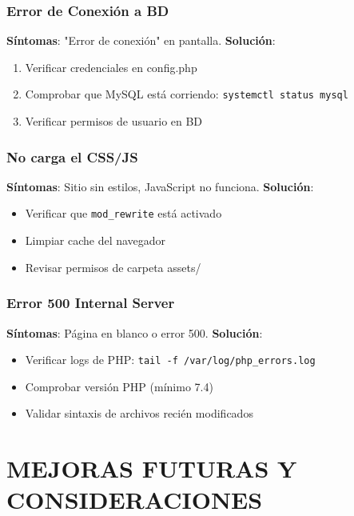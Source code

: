 \documentclass[12pt, a4paper]{report}
\begin{document}
\subsection{Error de Conexión a BD}
\textbf{Síntomas}: "Error de conexión" en pantalla.
\textbf{Solución}:
\begin{enumerate}
    \item Verificar credenciales en config.php
    \item Comprobar que MySQL está corriendo: \texttt{systemctl status mysql}
    \item Verificar permisos de usuario en BD
\end{enumerate}

\subsection{No carga el CSS/JS}
\textbf{Síntomas}: Sitio sin estilos, JavaScript no funciona.
\textbf{Solución}:
\begin{itemize}
    \item Verificar que \texttt{mod\_rewrite} está activado
    \item Limpiar cache del navegador
    \item Revisar permisos de carpeta assets/
\end{itemize}

\subsection{Error 500 Internal Server}
\textbf{Síntomas}: Página en blanco o error 500.
\textbf{Solución}:
\begin{itemize}
    \item Verificar logs de PHP: \texttt{tail -f /var/log/php_errors.log}
    \item Comprobar versión PHP (mínimo 7.4)
    \item Validar sintaxis de archivos recién modificados
\end{itemize}

\chapter{MEJORAS FUTURAS Y CONSIDERACIONES}
\end{document}
